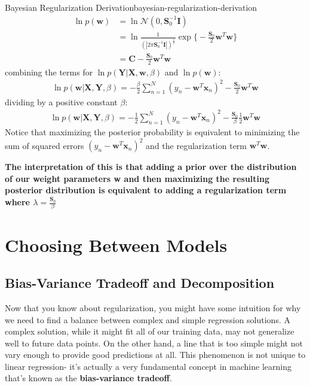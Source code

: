 \begin{derivation}{Bayesian Regularization Derivation}{bayesian-regularization-derivation}
    \begin{align*}
        \ln{p(\textbf{w})} &= \ln{\mathcal{N}(0, \boldsymbol{S}_{0}^{-1}\textbf{I})} \\
        &= \ln{\frac{1}{(|2\pi\boldsymbol{S}_{0}^{-1}\textbf{I}|)^{\frac{1}{2}}} \exp{\bigg\{-\frac{\boldsymbol{S}_{0}}{2} \textbf{w}^{T}\textbf{w}\bigg\}}} \\
        &= \textbf{C} -\frac{\boldsymbol{S}_{0}}{2} \textbf{w}^{T}\textbf{w}
    \end{align*}
    combining the terms for $\ln{p(\textbf{Y}| \textbf{X}, \textbf{w}, \beta)}$ and $\ln{p(\textbf{w})}$:
    \begin{align*}
        \ln{p(\textbf{w}|\textbf{X},\textbf{Y}, \beta)} = -\frac{\beta}{2}\sum_{n=1}^{N} (y_{n} - \textbf{w}^{T} \textbf{x}_{n})^2 - \frac{\boldsymbol{S}_{0}}{2} \textbf{w}^{T}\textbf{w}
    \end{align*}
    dividing by a positive constant $\beta$:
    \begin{align*}
        \ln{p(\textbf{w}|\textbf{X},\textbf{Y}, \beta)} = -\frac{1}{2}\sum_{n=1}^{N} (y_{n} - \textbf{w}^{T} \textbf{x}_{n})^2 - \frac{\boldsymbol{S}_{0}}{\beta}\frac{1}{2} \textbf{w}^{T}\textbf{w}
    \end{align*}
    Notice that maximizing the posterior probability is equivalent to minimizing the sum of squared errors $(y_{n} - \textbf{w}^{T} \textbf{x}_{n})^2$ and the regularization term $\textbf{w}^{T}\textbf{w}$.
\end{derivation}

\textbf{The interpretation of this is that adding a prior over the distribution of our weight parameters \textbf{w} and then maximizing the resulting posterior distribution is equivalent to adding a regularization term where $\lambda = \frac{\boldsymbol{S}_{0}}{\beta}$}

\section{Choosing Between Models}
\subsection{Bias-Variance Tradeoff and Decomposition}
Now that you know about regularization, you might have some intuition for why we need to find a balance between complex and simple regression solutions. A complex solution, while it might fit all of our training data, may not generalize well to future data points. On the other hand, a line that is too simple might not vary enough to provide good predictions at all. This phenomenon is not unique to linear regression- it's actually a very fundamental concept in machine learning that's known as the \textbf{bias-variance tradeoff}.

